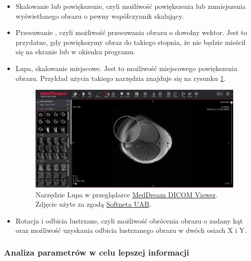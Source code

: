 \begin{itemize}
    \item Skalowanie lub powiększenie, czyli możliwość powiększenia lub zmniejszenia wyświetlanego obrazu o pewny współczynnik skalujący.

    \item Przesuwanie , czyli możliwość przesuwania obrazu o dowolny wektor.
          Jest to przydatne, gdy powiększymy obraz do takiego stopnia, że nie będzie mieścił się na ekranie lub w okienku programu.

    \item Lupa, skalowanie miejscowe.
          Jest to możliwość miejscowego powiększenia obrazu.
          Przykład użycia takiego narzędzia znajduje się na rysunku \ref{fig:wyswietlanie001}.

          \begin{figure}[!htbp]
              \centering
              \includegraphics[width=\textwidth]{img/wyswietlanie001.png}
              \caption{Narzędzie Lupa w przeglądarce \href{https://www.softneta.com/products/meddream-dicom-viewer/}{MedDream DICOM Viewer}. Zdjęcie użyte za zgodą \href{https://www.softneta.com/}{Softneta UAB}.}
              \label{fig:wyswietlanie001}
          \end{figure}

    \item Rotacja i odbicia lustrzane, czyli możliwość obrócenia obrazu o zadany kąt oraz możliwość uzyskania odbicia lustrzanego obrazu w dwóch osiach X i Y.

\end{itemize}

\subsubsection{Analiza parametrów w celu lepszej informacji}

